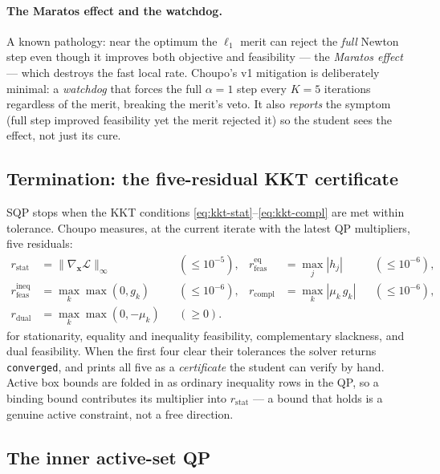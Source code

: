 \documentclass[11pt,a4paper]{article}
\newcommand{\xv}{\mathbf{x}}
\begin{document}
\paragraph{The Maratos effect and the watchdog.}
A known pathology: near the optimum the $\ell_1$ merit can reject the
\emph{full} Newton step even though it improves both objective and
feasibility --- the \emph{Maratos effect} \cite{NocedalWright} --- which
destroys the fast local rate. Choupo's v1 mitigation is deliberately
minimal: a \emph{watchdog} that forces the full $\alpha = 1$ step every
$K = 5$ iterations regardless of the merit, breaking the merit's veto. It
also \emph{reports} the symptom (full step improved feasibility yet the
merit rejected it) so the student sees the effect, not just its cure.

\subsection{Termination: the five-residual KKT certificate}

SQP stops when the KKT conditions
\eqref{eq:kkt-stat}--\eqref{eq:kkt-compl} are met within tolerance.
Choupo measures, at the current iterate with the latest QP multipliers,
five residuals:
\begin{equation}
\begin{aligned}
   r_{\mathrm{stat}}  &= \|\nabla_{\!\xv}\mathcal L\|_\infty
     && (\le 10^{-5}), &
   r_{\mathrm{feas}}^{\mathrm{eq}}  &= \max_j |h_j|
     && (\le 10^{-6}), \\
   r_{\mathrm{feas}}^{\mathrm{ineq}} &= \max_k \max(0, g_k)
     && (\le 10^{-6}), &
   r_{\mathrm{compl}} &= \max_k |\mu_k\, g_k|
     && (\le 10^{-6}), \\
   r_{\mathrm{dual}}  &= \max_k \max(0, -\mu_k)
     && (\ge 0). &&&
\end{aligned}
\end{equation}
for stationarity, equality and inequality feasibility, complementary
slackness, and dual feasibility. When the first four clear their
tolerances the solver returns \texttt{converged}, and prints all five as
a \emph{certificate} the student can verify by hand. Active box bounds
are folded in as ordinary inequality rows in the QP, so a binding bound
contributes its multiplier into $r_{\mathrm{stat}}$ --- a bound that
holds is a genuine active constraint, not a free direction.

\subsection{The inner active-set QP}\label{ch:active-set-qp}
\end{document}
